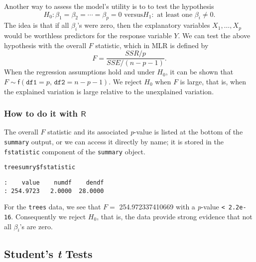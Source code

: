 Another way to assess the model's utility is to to test the hypothesis
\[ H_{0}:\beta_{1}=\beta_{2}=\cdots=\beta_{p}=0\mbox{ versus
}H_{1}:\mbox{ at least one $\beta_{i}\neq0$}.  \] The idea is that if
all \(\beta_{i}\)'s were zero, then the explanatory variables
\(X_{1},\ldots,X_{p}\) would be worthless predictors for the response
variable \(Y\). We can test the above hypothesis with the overall
\(F\) statistic, which in MLR is defined by
\begin{equation}
F=\frac{SSR/p}{SSE/(n-p-1)}.
\end{equation}
When the regression assumptions hold and under \(H_{0}\), it can be
shown that
\(F\sim\mathsf{f}(\mathtt{df1}=p,\,\mathtt{df2}=n-p-1)\). We reject
\(H_{0}\) when \(F\) is large, that is, when the explained variation
is large relative to the unexplained variation.

\subsubsection{How to do it with \(\mathsf{R}\)}
\label{sec-12-3-2-1}

The overall \(F\) statistic and its associated \emph{p}-value is listed at
the bottom of the \texttt{summary} output, or we can access it directly by
name; it is stored in the \texttt{fstatistic} component of the \texttt{summary}
object.

\begin{verbatim}
treesumry$fstatistic
\end{verbatim}

\begin{verbatim}
:    value    numdf    dendf 
: 254.9723   2.0000  28.0000
\end{verbatim}

For the \texttt{trees} data, we see that \( F = \)
254.972337410669 with a \emph{p}-value \texttt{<
2.2e-16}. Consequently we reject \(H_{0}\), that is, the data provide
strong evidence that not all \(\beta_{i}\)'s are zero.

\subsection{Student's \emph{t} Tests}
\label{sec-12-3-3}

